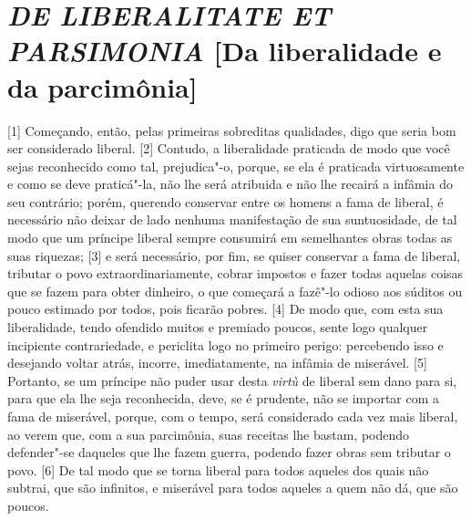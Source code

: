 \quebra\section{\emph{DE LIBERALITATE ET PARSIMONIA}\break
{[}Da liberalidade e da parcimônia{]}}

{[}1{]} Começando, então, pelas primeiras sobreditas qualidades, digo
que seria bom ser considerado liberal. {[}2{]} Contudo, a liberalidade
praticada de modo que você sejas reconhecido como tal, prejudica"-o,
porque, se ela é praticada virtuosamente e como se deve praticá"-la, não
lhe será atribuida e não lhe recairá a infâmia do seu contrário; porém,
querendo conservar entre os homens a fama de liberal, é necessário não
deixar de lado nenhuma manifestação de sua suntuosidade, de tal modo que
um príncipe liberal sempre consumirá em semelhantes obras todas as suas
riquezas; {[}3{]} e será necessário, por fim, se quiser conservar a fama
de liberal, tributar o povo extraordinariamente, cobrar impostos e fazer
todas aquelas coisas que se fazem para obter dinheiro, o que começará a
fazê"-lo odioso aos súditos ou pouco estimado por todos, pois ficarão
pobres. {[}4{]} De modo que, com esta sua liberalidade, tendo ofendido
muitos e premiado poucos, sente logo qualquer incipiente contrariedade,
e periclita logo no primeiro perigo: percebendo isso e desejando voltar
atrás, incorre, imediatamente, na infâmia de miserável. {[}5{]}
Portanto, se um príncipe não puder usar desta \emph{virtù} de liberal
sem dano para si, para que ela lhe seja reconhecida, deve, se é
prudente, não se importar com a fama de miserável, porque, com o tempo,
será considerado cada vez mais liberal, ao verem que, com a sua
parcimônia, suas receitas lhe bastam, podendo defender"-se daqueles que
lhe fazem guerra, podendo fazer obras sem tributar o povo. {[}6{]} De
tal modo que se torna liberal para todos aqueles dos quais não subtrai,
que são infinitos, e miserável para todos aqueles a quem não dá, que são
poucos.

